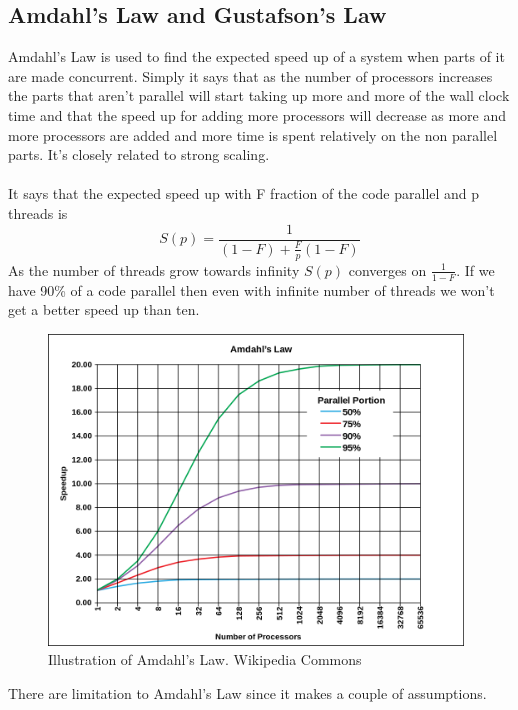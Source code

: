 \documentclass[10pt,a4paper]{report}
\begin{document}
\newpage
\subsection{Amdahl's Law and Gustafson's Law}
Amdahl's Law is used to find the expected speed up of a system when parts of it are made concurrent. Simply it says that as the number of processors increases the parts that aren't parallel will start taking up more and more of the wall clock time and that the speed up for adding more processors will decrease as more and more processors are added and more time is spent relatively on the non parallel parts\cite{introduction_hpc_hager}. It's closely related to strong scaling.\cite{cuda_best_practice,2010_reevaluating_amdahl}\\
\\
It says that the expected speed up with F fraction of the code parallel and p threads is\cite{introduction_hpc_hager} 
$$S(p)=\frac{1}{(1-F)+\frac{F}{p}(1-F)}$$
As the number of threads grow towards infinity $S(p)$ converges on $\frac{1}{1-F}$. If we have 90\% of a code parallel then even with infinite number of threads we won't get a better speed up than ten.\cite{2010_reevaluating_amdahl}

\begin{figure}[h]
    \centering
    \includegraphics[width=11cm]{AmdahlsLaw.png}
    \caption{Illustration of Amdahl's Law. Wikipedia Commons}
    \label{fig:AmdahlsLaw}
\end{figure}

There are limitation to Amdahl's Law since it makes a couple of assumptions.
\end{document}
